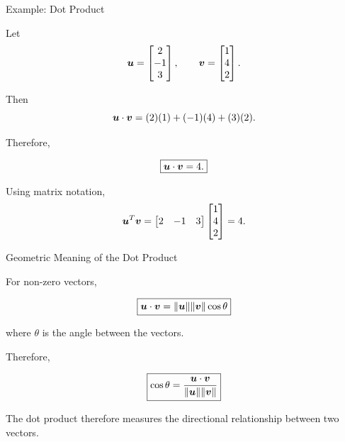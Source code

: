 \begin{frame}{Example: Dot Product}

Let
\vspace{-0.1cm}
\[
\bm{u}
=
\begin{bmatrix}
2\\
-1\\
3
\end{bmatrix},
\qquad
\bm{v}
=
\begin{bmatrix}
1\\
4\\
2
\end{bmatrix}.
\]

Then
\vspace{-0.1cm}
\[
\bm{u}\cdot\bm{v}
=
(2)(1)+(-1)(4)+(3)(2).
\]

Therefore,

\[
\boxed{
\bm{u}\cdot\bm{v}=4.
}
\]

Using matrix notation,
\vspace{-0.1cm}
\[
\bm{u}^{T}\bm{v}
=
\begin{bmatrix}
2&-1&3
\end{bmatrix}
\begin{bmatrix}
1\\4\\2
\end{bmatrix}
=4.
\]

\end{frame}



\begin{frame}{Geometric Meaning of the Dot Product}

For non-zero vectors,

\[
\boxed{
\bm{u}\cdot\bm{v}
=
\|\bm{u}\|
\|\bm{v}\|
\cos\theta
}
\]

where $\theta$ is the angle between the vectors.

Therefore,

\[
\boxed{
\cos\theta
=
\frac{\bm{u}\cdot\bm{v}}
{\|\bm{u}\|\|\bm{v}\|}
}
\]

The dot product therefore measures the directional
relationship between two vectors.

\end{frame}



